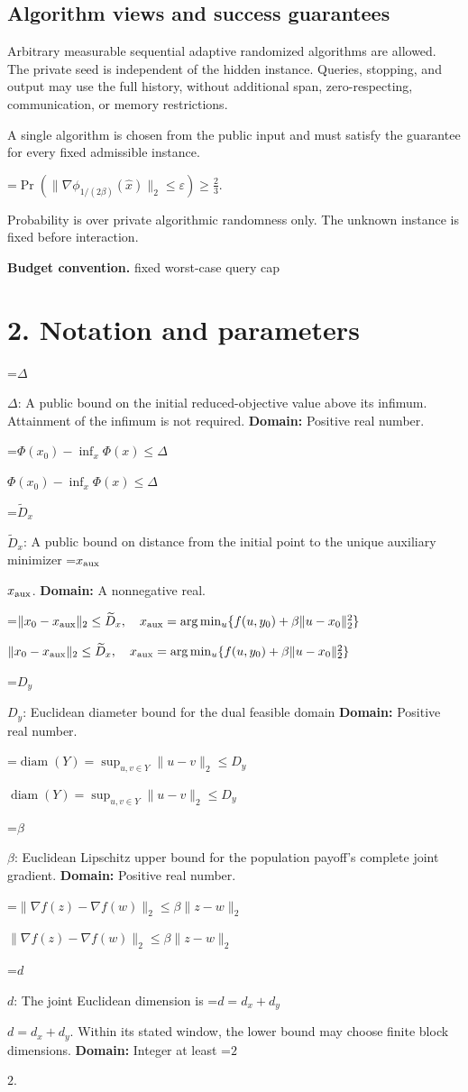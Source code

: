 \documentclass[10pt,a4paper]{article}
\newcommand{\AtlasMath}[1]{\par\begingroup\centering\setbox0=\hbox{$\displaystyle #1$}\ifdim\wd0>1.4\linewidth\typeout{ATLAS WIDE FORMULA: \the\wd0}\fi\ifdim\wd0>\linewidth\resizebox{\linewidth}{!}{\box0}\else\box0\fi\par\endgroup}
\newcommand{\AtlasInlineMath}[1]{\begingroup\setbox0=\hbox{$#1$}\ifdim\wd0>.4\linewidth\endgroup\AtlasMath{#1}\else\endgroup$#1$\fi}
\begin{document}
\subsection{Algorithm views and success guarantees}
Arbitrary measurable sequential adaptive randomized algorithms are allowed. The private seed is independent of the hidden instance. Queries, stopping, and output may use the full history, without additional span, zero-respecting, communication, or memory restrictions.

A single algorithm is chosen from the public input and must satisfy the guarantee for every fixed admissible instance.


\AtlasMath{\Pr\!\left(\|\nabla\phi_{1/(2\beta)}(\widehat{x})\|_2\le\varepsilon\right)\ge\frac23.}


Probability is over private algorithmic randomness only. The unknown instance is fixed before interaction.

\textbf{Budget convention.} fixed worst-case query cap

\section{2. Notation and parameters}
\AtlasInlineMath{\Delta}: A public bound on the initial reduced-objective value above its infimum. Attainment of the infimum is not required. \textbf{Domain:} Positive real number.

\AtlasInlineMath{\Phi(x_0)-\inf_x\Phi(x)\le\Delta}

\AtlasInlineMath{\widetilde{D}_x}: A public bound on distance from the initial point to the unique auxiliary minimizer \AtlasInlineMath{x_{\rm aux}}. \textbf{Domain:} A nonnegative real.

\AtlasInlineMath{\|x_0-x_{\rm aux}\|_2\le\widetilde D_x,\quad x_{\rm aux}=\arg\min_u\{f(u,y_0)+\beta\|u-x_0\|_2^2\}}

\AtlasInlineMath{D_y}: Euclidean diameter bound for the dual feasible domain \textbf{Domain:} Positive real number.

\AtlasInlineMath{\operatorname{diam}(Y)=\sup_{u,v\in Y}\|u-v\|_2\le D_y}

\AtlasInlineMath{\beta}: Euclidean Lipschitz upper bound for the population payoff's complete joint gradient. \textbf{Domain:} Positive real number.

\AtlasInlineMath{\|\nabla f(z)-\nabla f(w)\|_2\le\beta\|z-w\|_2}

\AtlasInlineMath{d}: The joint Euclidean dimension is \AtlasInlineMath{d=d_x+d_y}. Within its stated window, the lower bound may choose finite block dimensions. \textbf{Domain:} Integer at least \AtlasInlineMath{2}.
\end{document}

